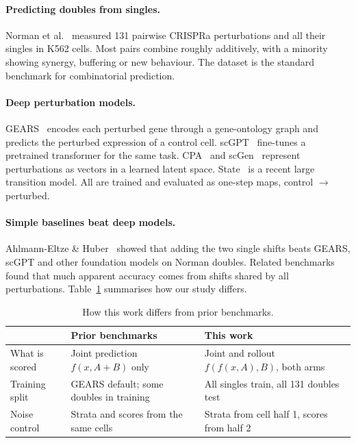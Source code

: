 \documentclass[11pt]{article}
\begin{document}
\paragraph{Predicting doubles from singles.} Norman et al.~\cite{norman} measured 131
pairwise CRISPRa perturbations and all their singles in K562 cells. Most pairs combine
roughly additively, with a minority showing synergy, buffering or new behaviour. The
dataset is the standard benchmark for combinatorial prediction.

\paragraph{Deep perturbation models.} GEARS~\cite{gears} encodes each perturbed gene
through a gene-ontology graph and predicts the perturbed expression of a control cell.
scGPT~\cite{scgpt} fine-tunes a pretrained transformer for the same task.
CPA~\cite{cpa} and scGen~\cite{scgen} represent perturbations as vectors in a learned
latent space. State~\cite{state} is a recent large transition model. All are trained and
evaluated as one-step maps, control $\to$ perturbed.

\paragraph{Simple baselines beat deep models.} Ahlmann-Eltze \& Huber~\cite{ahlmann} showed
that adding the two single shifts beats GEARS, scGPT and other foundation models on Norman
doubles. Related benchmarks~\cite{perteval,csendes,systema} found that much apparent
accuracy comes from shifts shared by all perturbations. Table~\ref{tab:diff} summarises how
our study differs.

\begin{table}[h]
\centering
\caption{How this work differs from prior benchmarks.}
\label{tab:diff}
\begin{tabularx}{\linewidth}{lXX}
\toprule
 & Prior benchmarks & This work \\
\midrule
What is scored & Joint prediction $f(x, A{+}B)$ only & Joint and rollout $f(f(x, A), B)$, both arms \\
Training split & GEARS default; some doubles in training & All singles train, all 131 doubles test \\
Noise control & Strata and scores from the same cells & Strata from cell half 1, scores from half 2 \\
\bottomrule
\end{tabularx}
\end{table}
\end{document}
